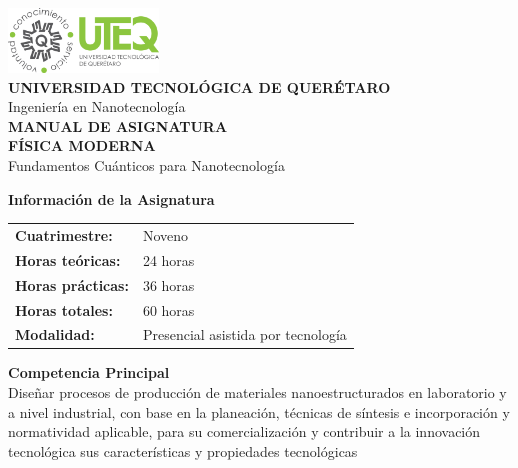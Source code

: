 \documentclass[12pt,a4paper]{book}
\begin{document}
	
	\begin{titlepage}
		\begin{center}
			
			\includegraphics[width=4cm]{../../Imagenes/Logo_uteq}\\[1cm]
			
			{\large \textcolor{uteqblue}{\textbf{UNIVERSIDAD TECNOLÓGICA DE QUERÉTARO}}}\\[0.3cm]
			
			{\normalsize \textcolor{uteqgray}{Ingeniería en Nanotecnología}}\\[1cm]
			
			{\Huge \textcolor{uteqblue}{\textbf{MANUAL DE ASIGNATURA}}}\\[1cm]
			
			{\LARGE \textcolor{uteqgray}{\textbf{FÍSICA MODERNA}}}\\[0.5cm]
			{\large \textcolor{uteqgray}{Fundamentos Cuánticos para Nanotecnología}}\\[3cm]
			
			\begin{tcolorbox}[colback=uteqblue!10!white,colframe=uteqblue,width=14cm]
				\begin{center}
					\textbf{Información de la Asignatura}\\[0.5cm]
					\begin{tabular}{ll}
						\textbf{Cuatrimestre:} & Noveno \\
						\textbf{Horas teóricas:} & 24 horas \\
						\textbf{Horas prácticas:} & 36 horas \\
						\textbf{Horas totales:} & 60 horas \\
						\textbf{Modalidad:} & Presencial asistida por tecnología \\
						
					\end{tabular}
				\end{center}
			\end{tcolorbox}
			
			\vspace{1cm}
			
			\begin{tcolorbox}[colback=uteqgreen!10!white,colframe=uteqgreen,width=14cm]
				\begin{center}
					\textbf{Competencia Principal}\\[0.3cm]
					\small{Diseñar procesos de producción de materiales nanoestructurados en laboratorio y a nivel industrial, con 
						base en la planeación, técnicas de síntesis e incorporación y normatividad aplicable, para su 
						comercialización y contribuir a la innovación tecnológica	sus características y propiedades tecnológicas}
				\end{center}
			\end{tcolorbox}
			

\end{center}
\end{titlepage}
\end{document}
